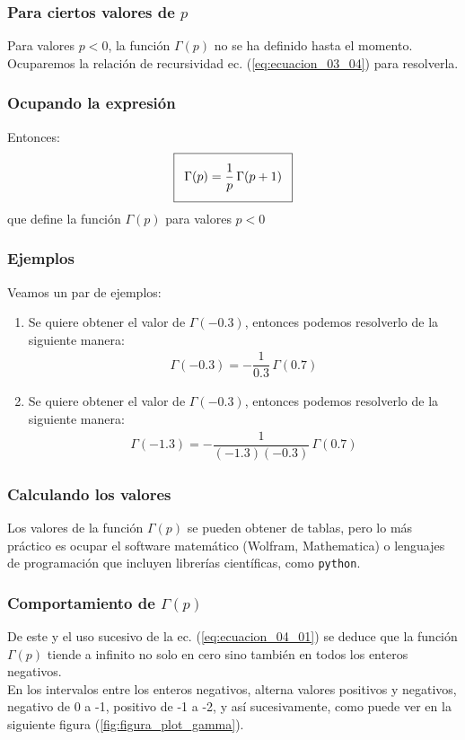 \documentclass[12pt]{beamer}
\begin{document}
\begin{frame}
\frametitle{Para ciertos valores de $p$}
Para valores $p < 0$, la función $\Gamma (p)$ no se ha definido hasta el momento.
\\
\bigskip
\pause
Ocuparemos la relación de recursividad ec. (\ref{eq:ecuacion_03_04}) para resolverla.
\end{frame}
\begin{frame}
\frametitle{Ocupando la expresión}
Entonces:
\pause
\begin{align}\addtolength{\fboxsep}{5pt}\boxed{
\Gamma (p) = \dfrac{1}{p} \, \Gamma (p + 1)}
\label{eq:ecuacion_04_01}
\end{align}
que define la función $\Gamma (p)$ para valores $p < 0$
\end{frame}
\begin{frame}
\frametitle{Ejemplos}
Veamos un par de ejemplos:
\pause
{}
\begin{enumerate}[<+->]
\item  Se quiere obtener el valor de $\Gamma (-0.3)$, entonces podemos resolverlo de la siguiente manera:
\begin{align*}
\Gamma (-0.3) = - \dfrac{1}{0.3} \, \Gamma (0.7)
\end{align*}
\item  Se quiere obtener el valor de $\Gamma (-0.3)$, entonces podemos resolverlo de la siguiente manera:
\begin{align*}
\Gamma (-1.3) = - \dfrac{1}{(-1.3)(-0.3)} \, \Gamma (0.7)
\end{align*}
\end{enumerate}
\end{frame}
\begin{frame}
\frametitle{Calculando los valores}
Los valores de la función $\Gamma (p)$ se pueden obtener de tablas, pero lo más práctico es ocupar el software matemático (Wolfram, Mathematica) o lenguajes de programación que incluyen librerías científicas, como \texttt{python}.
\end{frame}
\begin{frame}
\frametitle{Comportamiento de $\Gamma (p)$}
De este y el uso sucesivo de la ec. (\ref{eq:ecuacion_04_01}) se deduce que la función $\Gamma (p)$ tiende a infinito no solo en cero sino también en todos los enteros negativos.
\\
\bigskip
\pause
En los intervalos entre los enteros negativos, alterna valores positivos y negativos, negativo de 0 a -1, positivo de -1 a -2, y así sucesivamente, como puede ver en la siguiente figura (\ref{fig:figura_plot_gamma}).
\end{frame}
\end{document}
